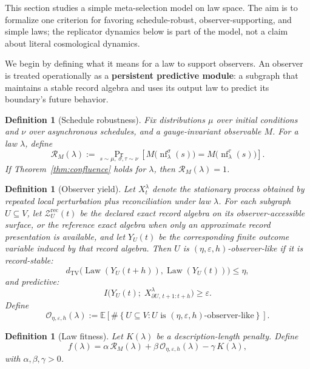 \documentclass[11pt]{article}
\newtheorem{definition}[theorem]{Definition}
\theoremstyle{remark}
\theoremstyle{plain}
\begin{document}
This section studies a simple meta-selection model on law space. The aim is to formalize one
criterion for favoring schedule-robust, observer-supporting, and simple laws; the replicator
dynamics below is part of the model, not a claim about literal cosmological dynamics.

We begin by defining what it means for a law to support observers. An observer is treated
operationally as a \textbf{persistent predictive module}: a subgraph that maintains a stable
record algebra and uses its output law to predict its boundary's future behavior.

\begin{definition}[Schedule robustness]\label{def:robustness}
Fix distributions $\mu$ over initial conditions and $\nu$ over asynchronous schedules, and a gauge-invariant observable $M$. For a law $\lambda$, define
\[
\mathcal{R}_M(\lambda)
:=
\Pr_{s\sim\mu,\;\sigma,\tau\sim\nu}
\!\left[
M\bigl(\operatorname{nf}^{\sigma}_\lambda(s)\bigr)
=
M\bigl(\operatorname{nf}^{\tau}_\lambda(s)\bigr)
\right].
\]
If Theorem~\ref{thm:confluence} holds for $\lambda$, then $\mathcal{R}_M(\lambda)=1$.
\end{definition}

\begin{definition}[Observer yield]\label{def:yield}
Let $X_t^\lambda$ denote the stationary process obtained by repeated local perturbation plus
reconciliation under law $\lambda$. For each subgraph $U\subseteq V$, let
\(\mathcal Z_U^{\mathrm{rec}}(t)\) be the declared exact record algebra on its observer-accessible
surface, or the reference exact algebra when only an approximate record presentation is available,
and let $Y_U(t)$ be the corresponding finite outcome variable induced by that record algebra. Then $U$ is
\((\eta,\varepsilon,h)\)-observer-like if it is record-stable:
\[
d_{\mathrm{TV}}\!\bigl(\operatorname{Law}(Y_U(t+h)),\operatorname{Law}(Y_U(t))\bigr)\le \eta,
\]
and predictive:
\[
I\bigl(Y_U(t);\; X_{\partial U,\,t+1:t+h}^\lambda\bigr)\ge\varepsilon.
\]
Define
\[
\mathcal{O}_{\eta,\varepsilon,h}(\lambda)
:=
\mathbb{E}\!\left[
\#\left\{
U\subseteq V:
U \text{ is } (\eta,\varepsilon,h)\text{-observer-like}
\right\}
\right].
\]
\end{definition}

\begin{definition}[Law fitness]\label{def:fitness}
Let $K(\lambda)$ be a description-length penalty. Define
\[
f(\lambda) = \alpha\,\mathcal{R}_M(\lambda) + \beta\,\mathcal{O}_{\eta,\varepsilon,h}(\lambda) - \gamma\,K(\lambda),
\]
with $\alpha,\beta,\gamma>0$.
\end{definition}
\end{document}
